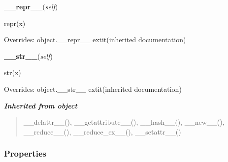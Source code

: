 \hspace{.8\funcindent}\begin{boxedminipage}{\funcwidth}

    \raggedright \textbf{\_\_repr\_\_}(\textit{self})

\setlength{\parskip}{2ex}
    repr(x)

\setlength{\parskip}{1ex}
      Overrides: object.\_\_repr\_\_ 	extit{(inherited documentation)}

    \end{boxedminipage}

    \vspace{0.5ex}

\hspace{.8\funcindent}\begin{boxedminipage}{\funcwidth}

    \raggedright \textbf{\_\_str\_\_}(\textit{self})

\setlength{\parskip}{2ex}
    str(x)

\setlength{\parskip}{1ex}
      Overrides: object.\_\_str\_\_ 	extit{(inherited documentation)}

    \end{boxedminipage}


\large{\textbf{\textit{Inherited from object}}}

\begin{quote}
\_\_delattr\_\_(), \_\_getattribute\_\_(), \_\_hash\_\_(), \_\_new\_\_(), \_\_reduce\_\_(), \_\_reduce\_ex\_\_(), \_\_setattr\_\_()
\end{quote}


  \subsubsection{Properties}

